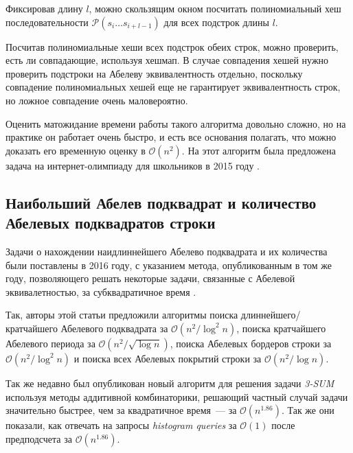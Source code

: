Фиксировав длину $l$, можно скользящим окном посчитать полиномиальный хеш последовательности $\mathcal{P}(s_i\ldots s_{i+l-1})$ для всех подстрок длины $l$. 

Посчитав полиномиальные хеши всех подстрок обеих строк, можно проверить, есть ли совпадающие, используя хешмап. В случае совпадения хешей нужно проверить подстроки на Абелеву эквивалентность отдельно, поскольку совпадение полиномиальных хешей еще не гарантирует эквивалентность строк, но ложное совпадение очень маловероятно.

Оценить матожидание времени работы такого алгоритма довольно сложно, но на практике он работает очень быстро, и есть все основания полагать, что можно доказать его временную оценку в $\mathcal{O}(n^2)$. На этот алгоритм была предложена задача на интернет-олимпиаду для школьников в 2015 году \cite{6}.

\subsection{Наибольший Абелев подквадрат и количество Абелевых подквадратов строки}
Задачи о нахождении наидлиннейшего Абелево подквадрата и их количества были поставлены в 2016 году, с указанием метода, опубликованным в том же году, позволяющего решать некоторые задачи, связанные с Абелевой эквивалетностью, за субквадратичное время \cite{5}.

Так, авторы этой статьи предложили алгоритмы поиска длиннейшего/кратчайшего Абелевого подквадрата за $\mathcal{O}(n^2 / \log^2 n)$, поиска кратчайшего Абелевого периода за $\mathcal{O}(n^2 / \sqrt{\log n})$, поиска Абелевых бордеров строки за $\mathcal{O}(n^2 / \log^2 n)$ и поиска всех Абелевых покрытий строки за $\mathcal{O}(n^2 / \log n)$.

Так же недавно был опубликован новый алгоритм для решения задачи \textit{3-SUM} используя методы аддитивной комбинаторики, решающий частный случай задачи значительно быстрее, чем за квадратичное время~--- за $\mathcal{O}(n^{1.86})$. Так же они показали, как отвечать на запросы \textit{histogram queries} за $\mathcal{O}(1)$ после предподсчета за $\mathcal{O}(n^{1.86})$.